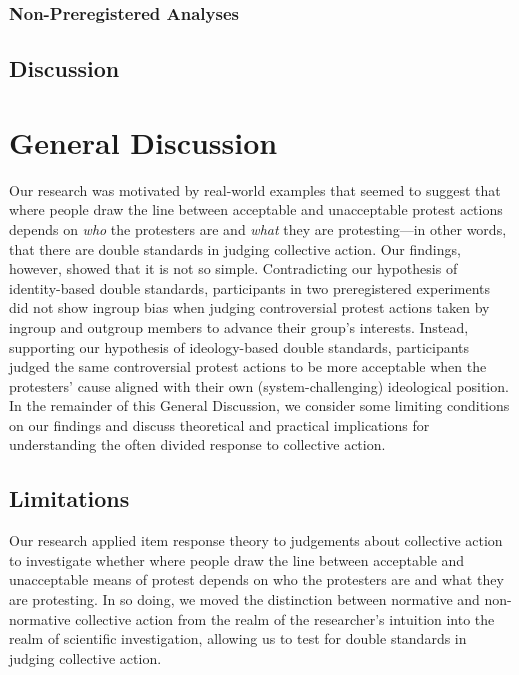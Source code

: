 \documentclass[twocolumn, 11pt, letterpaper]{article}
\begin{document}
\hypertarget{non-preregistered-analyses-2}{%
\subsubsection{Non-Preregistered
Analyses}\label{non-preregistered-analyses-2}}

\hypertarget{discussion-2}{%
\subsection{Discussion}\label{discussion-2}}

\hypertarget{general-discussion}{%
\section{General Discussion}\label{general-discussion}}

Our research was motivated by real-world examples that seemed to suggest
that where people draw the line between acceptable and unacceptable
protest actions depends on \emph{who} the protesters are and \emph{what}
they are protesting---in other words, that there are double standards in
judging collective action. Our findings, however, showed that it is not
so simple. Contradicting our hypothesis of identity-based double
standards, participants in two preregistered experiments did not show
ingroup bias when judging controversial protest actions taken by ingroup
and outgroup members to advance their group's interests. Instead,
supporting our hypothesis of ideology-based double standards,
participants judged the same controversial protest actions to be more
acceptable when the protesters' cause aligned with their own
(system-challenging) ideological position. In the remainder of this
General Discussion, we consider some limiting conditions on our findings
and discuss theoretical and practical implications for understanding the
often divided response to collective action.

\hypertarget{limitations}{%
\subsection{Limitations}\label{limitations}}

Our research applied item response theory to judgements about collective
action to investigate whether where people draw the line between
acceptable and unacceptable means of protest depends on who the
protesters are and what they are protesting. In so doing, we moved the
distinction between normative and non-normative collective action from
the realm of the researcher's intuition into the realm of scientific
investigation, allowing us to test for double standards in judging
collective action.
\end{document}
